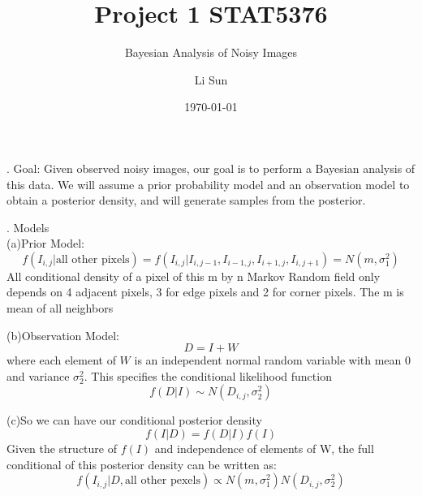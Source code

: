 \documentclass[11pt]{scrartcl}
\begin{document}
\title{Project 1 STAT5376}
\subtitle{Bayesian Analysis of Noisy Images}
\author{Li Sun}
\date{\today}
\maketitle

. Goal: Given observed noisy images, our goal is to perform a Bayesian analysis of this data. We will assume a prior probability model and an observation model to obtain a posterior density, and will generate samples from the posterior.

\bigskip

. Models\\
(a)Prior Model: \\
$$f(I_{i,j}|\text{all other pixels})=f(I_{i,j}|I_{i,j-1},I_{i-1,j},I_{i+1,j},I_{i,j+1})=N(m,\sigma^2_1)$$
All conditional density of a pixel of this m by n Markov Random field only depends on 4 adjacent pixels, 3 for edge pixels and 2 for corner pixels. The m is mean of all neighbors\\

\bigskip

(b)Observation Model:
$$D=I+W$$
where each element of $W$ is an independent normal random variable with mean $0$ and variance $\sigma^2_2$. This specifies the conditional likelihood function 
$$f(D|I) \sim N(D_{i,j}, \sigma^2_2)$$

\bigskip

(c)So we can have our conditional posterior density
$$f(I|D)=f(D|I)f(I)$$
Given the structure of $f(I)$ and independence of elements of W, the full conditional of this posterior density can be written as:
$$f(I_{i,j}|D, \text{all other pexels}) \propto N(m,\sigma^2_1)N(D_{i,j}, \sigma^2_2)$$

\bigskip
\end{document}
